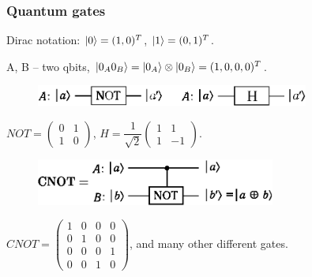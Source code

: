 \documentclass{beamer}
\DeclarePairedDelimiter\ket{\lvert}{\rangle}
\begin{document}
\begin{frame}
\frametitle{Quantum gates}
Dirac notation: $\ket{0} = (1, 0)^T$, $\ket{1} = (0, 1)^T$.

\medskip

A, B -- two qbits, $\ket{0_A 0_B} = \ket{0_A} \otimes \ket{0_B} = (1, 0, 0, 0)^T$.

\begin{figure}
\includegraphics[width=0.8\textwidth]{pic/not_and_H.eps}
\end{figure}

$NOT = \begin{pmatrix} 0 & 1 \\ 1 & 0 \end{pmatrix}$, $H = \dfrac{1}{\sqrt{2}} \begin{pmatrix} 1 & 1 \\ 1 & -1 \end{pmatrix}$.

\begin{figure}
\includegraphics[width=0.7\textwidth]{pic/cnot.eps}
\end{figure}

$CNOT = \begin{pmatrix}
1 & 0 & 0 & 0 \\
0 & 1 & 0 & 0 \\
0 & 0 & 0 & 1 \\
0 & 0 & 1 & 0
\end{pmatrix}$, and many other different gates.

\end{frame}
\end{document}
